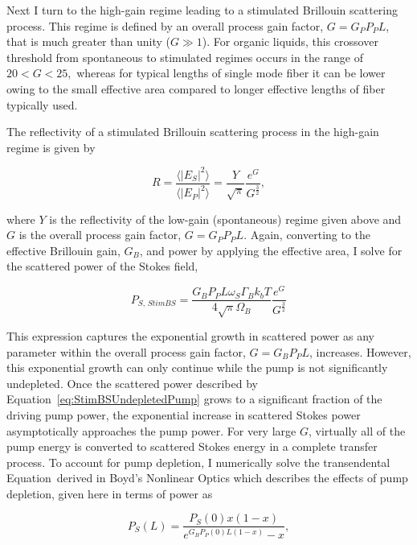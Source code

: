 Next I turn to the high-gain regime leading to a stimulated Brillouin scattering process. This regime is defined by an overall process gain factor, $G = G_{P}P_{P}L$, that is much greater than unity ($G \gg 1$). For organic liquids, this crossover threshold from spontaneous to stimulated regimes occurs in the range of $20 < G < 25,$\cite{boyd1990noise} whereas for typical lengths of single mode fiber it can be lower\cite{ippen1972stimulated} owing to the small effective area compared to longer effective lengths of fiber typically used.

The reflectivity of a stimulated Brillouin scattering process in the high-gain regime is given by \cite{boyd1990noise}

\begin{equation}
  R = \frac{\langle|E_{S}|^{2}\rangle}{\langle|E_{P}|^{2}\rangle} = \frac{Y}{\sqrt{\pi}}\frac{e^{G}}{G^{\frac{3}{2}}},
\end{equation}

where $Y$ is the reflectivity of the low-gain (spontaneous) regime given above and $G$ is the overall process gain factor, $G = G_{P}P_{P}L$. Again, converting to the effective Brillouin gain, $G_{B}$, and power by applying the effective area, I solve for the scattered power of the Stokes field,

\begin{equation}
  P_{S, \,\textit{StimBS}} = \frac{G_{B}P_{P}L\omega_{S}\Gamma_{B}k_{b}T}{4\sqrt{\pi}\Omega_{B}}\frac{e^{G}}{G^{\frac{3}{2}}}
  \label{eq:StimBSUndepletedPump}
\end{equation}

This expression captures the exponential growth in scattered power as any parameter within the overall process gain factor, $G = G_{B}P_{P}L$, increases. However, this exponential growth can only continue while the pump is not significantly undepleted. Once the scattered power described by Equation~\ref{eq:StimBSUndepletedPump} grows to a significant fraction of the driving pump power, the exponential increase in scattered Stokes power asymptotically approaches the pump power. For very large $G$, virtually all of the pump energy is converted to scattered Stokes energy in a complete transfer process.\cite{boyd2020nonlinear} To account for pump depletion, I numerically solve the transendental Equation~derived in Boyd's Nonlinear Optics which describes the effects of pump depletion, given here in terms of power as

\begin{equation}
  P_S(L) = \frac{P_S(0)x(1 - x)}{e^{G_{B}P_{P}(0)L(1 - x)} - x},
\end{equation}

